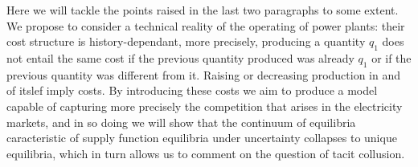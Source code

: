 Here we will tackle the points raised in the last two paragraphs to some extent. We propose to consider a technical reality of the operating of power plants: their cost structure is history-dependant, more precisely, producing a quantity $q_1$ does not entail the same cost if the previous quantity produced was already $q_1$ or if the previous quantity was different from it. Raising or decreasing production in and of itslef imply costs. By introducing these costs we aim to produce a model capable of capturing more precisely the competition that arises in the electricity markets, and in so doing we will show that the continuum of equilibria caracteristic of supply function equilibria under uncertainty collapses to unique equilibria, which in turn allows us to comment on the question of tacit collusion.\\


%
%
%
%
%

